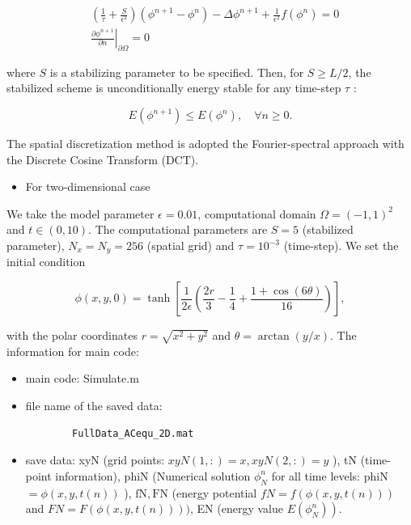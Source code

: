 $$
\begin{aligned}
& \left(\frac{1}{\tau}+\frac{S}{\epsilon^2}\right)\left(\phi^{n+1}-\phi^n\right)-\Delta \phi^{n+1}+\frac{1}{\epsilon^2} f\left(\phi^n\right)=0 \\
& \left.\frac{\partial \phi^{n+1}}{\partial n}\right|_{\partial \Omega}=0
\end{aligned}
$$

where $S$ is a stabilizing parameter to be specified. Then, for $S \geq L / 2$, the stabilized scheme is unconditionally energy stable for any time-step $\tau$ :

$$
E\left(\phi^{n+1}\right) \leq E\left(\phi^n\right), \quad \forall n \geq 0 .
$$


The spatial discretization method is adopted the Fourier-spectral approach with the Discrete Cosine Transform (DCT).

\begin{itemize}
    \item For two-dimensional case
\end{itemize} 

We take the model parameter $\epsilon=0.01$, computational domain $\Omega=(-1,1)^2$ and $t \in(0,10)$. The computational parameters are $S=5$ (stabilized parameter), $N_x=N_y=256$ (spatial grid) and $\tau=10^{-3}$ (time-step). We set the initial condition

$$
\phi(x, y, 0)=\tanh \left[\frac{1}{2 \epsilon}\left(\frac{2 r}{3}-\frac{1}{4}+\frac{1+\cos (6 \theta)}{16}\right)\right],
$$

with the polar coordinates $r=\sqrt{x^2+y^2}$ and $\theta=\arctan (y / x)$.
The information for main code:
\begin{itemize}
    \item main code: Simulate.m
    \item file name of the saved data: \begin{verbatim}
        FullData_ACequ_2D.mat
    \end{verbatim}
    \item save data: xyN (grid points: $x y N(1,:)=x, x y N(2,:)=y$ ), tN (time-point information), phiN (Numerical solution $\phi_N^n$ for all time levels: phiN $=\phi(x, y, t(n))$ ), $\mathrm{fN}, \mathrm{FN}$ (energy potential $f N=f(\phi(x, y, t(n)))$ and $F N=F(\phi(x, y, t(n))))$, EN (energy value $\left.E\left(\phi_N^n\right)\right)$.
\end{itemize}

\newpage

